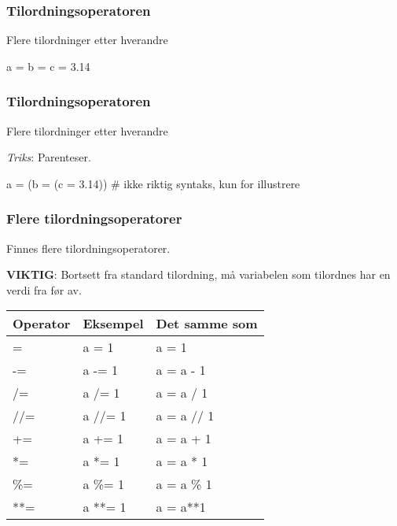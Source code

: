 
\begin{frame}[fragile]
    \frametitle{Tilordningsoperatoren}

    Flere tilordninger etter hverandre 

\begin{python}
a = b = c = 3.14
\end{python}

\end{frame}


\begin{frame}[fragile]
    \frametitle{Tilordningsoperatoren}

    Flere tilordninger etter hverandre 

    \textit{Triks}: Parenteser. 

\begin{python}
a = (b = (c = 3.14)) 
# ikke riktig syntaks, kun for illustrere
\end{python}

\end{frame}

\begin{frame}[fragile]
    \frametitle{Flere tilordningsoperatorer}

    Finnes flere tilordningsoperatorer. 
    
    \textbf{VIKTIG}: Bortsett fra standard tilordning, må variabelen som tilordnes har en verdi fra før av. 

    \begin{table}[]
        \begin{tabular}{|l|l|l|}
        \hline
        Operator & Eksempel & Det samme som \\ \hline
        =        & a = 1    & a = 1         \\ \hline
        -=       & a -= 1   & a = a - 1     \\ \hline
        /=       & a /= 1   & a = a / 1     \\ \hline
        //=      & a //= 1  & a = a // 1    \\ \hline
        +=       & a += 1   & a = a + 1     \\ \hline
        *=       & a *= 1   & a = a * 1     \\ \hline
        \%=      & a \%= 1  & a = a \% 1    \\ \hline
        **=      & a **= 1  & a = a**1      \\ \hline
        \end{tabular}
        \end{table}

\end{frame}

